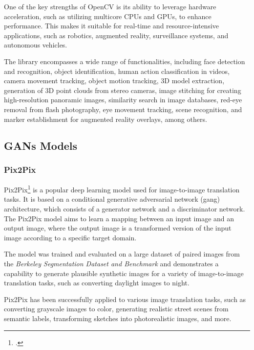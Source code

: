 One of the key strengths of OpenCV is its ability to leverage hardware acceleration, such as utilizing multicore CPUs and GPUs, to enhance performance. 
This makes it suitable for real-time and resource-intensive applications, such as robotics, augmented reality, surveillance systems, and autonomous vehicles.

The library encompasses a wide range of functionalities, including face detection and recognition, object identification, human action classification in videos, camera movement tracking, object motion tracking, 3D model extraction, generation of 3D point clouds from stereo cameras, image stitching for creating high-resolution panoramic images, similarity search in image databases, red-eye removal from flash photography, eye movement tracking, scene recognition, and marker establishment for augmented reality overlays, among others.

\subsection{GANs Models}\label{subsec:gans-models}
\subsubsection{Pix2Pix}\label{subsubsec:pix2pix}
Pix2Pix\footcite{paper:pix2pix} is a popular deep learning model used for image-to-image translation tasks. It is based on a conditional generative adversarial network (\gls{gang}) architecture, which consists of a generator network and a discriminator network. 
The Pix2Pix model aims to learn a mapping between an input image and an output image, where the output image is a transformed version of the input image according to a specific target domain.

The model was trained and evaluated on a large dataset of paired images from the \textit{Berkeley Segmentation Dataset and Benchmark} and demonstrates a capability to generate plausible synthetic images for a variety of image-to-image translation tasks, such as converting daylight images to night.

Pix2Pix has been successfully applied to various image translation tasks, such as converting grayscale images to color, generating realistic street scenes from semantic labels, transforming sketches into photorealistic images, and more.

